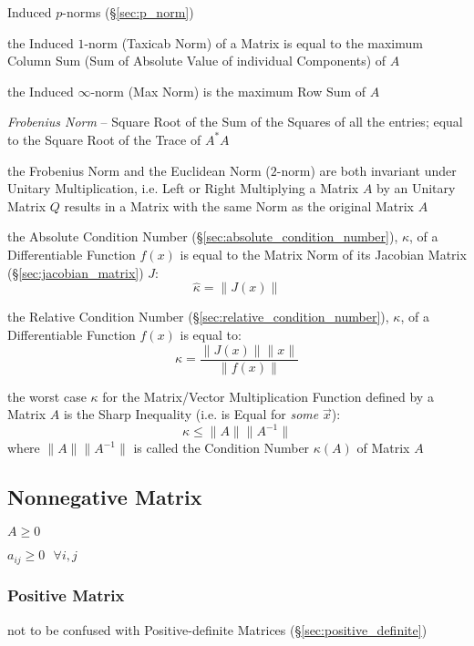 Induced $p$-norms (\S\ref{sec:p_norm})

the Induced $1$-norm (Taxicab Norm) of a Matrix is equal to the maximum Column
Sum (Sum of Absolute Value of individual Components) of $A$

the Induced $\infty$-norm (Max Norm) is the maximum Row Sum of $A$


\emph{Frobenius Norm} -- Square Root of the Sum of the Squares of all the
entries; equal to the Square Root of the Trace of $A^*A$


the Frobenius Norm and the Euclidean Norm ($2$-norm) are both invariant under
Unitary Multiplication, i.e. Left or Right Multiplying a Matrix $A$ by an
Unitary Matrix $Q$ results in a Matrix with the same Norm as the original
Matrix $A$

the Absolute Condition Number (\S\ref{sec:absolute_condition_number}),
$\hat{\kappa}$, of a Differentiable Function $f(x)$ is equal to the Matrix Norm
of its Jacobian Matrix (\S\ref{sec:jacobian_matrix}) $J$:
\[
  \hat{\kappa} = \|J(x)\|
\]

the Relative Condition Number (\S\ref{sec:relative_condition_number}),
$\kappa$, of a Differentiable Function $f(x)$ is equal to:
\[
  \kappa = \frac{\|J(x)\| \|x\|}{\|f(x)\|}
\]

the worst case $\kappa$ for the Matrix/Vector Multiplication Function defined
by a Matrix $A$ is the Sharp Inequality (i.e. is Equal for \emph{some}
$\vec{x}$):
\[
  \kappa \leq \|A\|\|A^{-1}\|
\]
where $\|A\|\|A^{-1}\|$ is called the Condition Number $\kappa(A)$ of Matrix
$A$



\subsection{Nonnegative Matrix}\label{sec:nonnegative_matrix}

$A \geq 0$

$a_{ij} \geq 0 \ \ \ \forall i,j$



\subsubsection{Positive Matrix}\label{sec:positive_matrix}

\fist not to be confused with Positive-definite Matrices
(\S\ref{sec:positive_definite})



